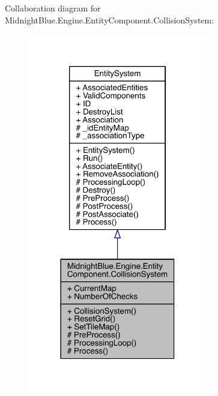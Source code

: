 Collaboration diagram for Midnight\+Blue.\+Engine.\+Entity\+Component.\+Collision\+System\+:
\nopagebreak
\begin{figure}[H]
\begin{center}
\leavevmode
\includegraphics[width=222pt]{class_midnight_blue_1_1_engine_1_1_entity_component_1_1_collision_system__coll__graph}
\end{center}
\end{figure}
